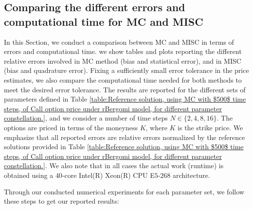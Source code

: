 



\subsection{Comparing the different  errors and computational time for MC and MISC}\label{sec:Comparing different  errors and complexity for MC and MISC}



In this Section, we conduct a comparison between MC and MISC in terms of errors and computational time. we show tables and plots reporting  the different relative errors involved in MC method (bias and statistical error), and in MISC (bias and quadrature error).  Fixing a  sufficiently small error tolerance in the price estimates,  we also compare the computational time needed for both methods to meet the desired error tolerance. The results are reported for the different sets of parameters defined in Table \ref{table:Reference solution, using MC with $500$ time steps, of Call option price under rBergomi model, for different parameter constellation.}, and we consider   a number of time steps $N \in \{2,4,8,16\}$.  The options are priced in terms of the moneyness $K$, where $K$ is the strike price.  We emphasize that all reported errors are relative errors normalized by the reference solutions provided in Table \ref{table:Reference solution, using MC with $500$ time steps, of Call option price under rBergomi model, for different parameter constellation.}. We also note that  in all cases the actual work (runtime) is obtained using a $40$-core Intel(R) Xeon(R) CPU E$5$-$268$ architecture. 


Through our conducted numerical experiments for each parameter set, we follow these steps to get our reported results:

